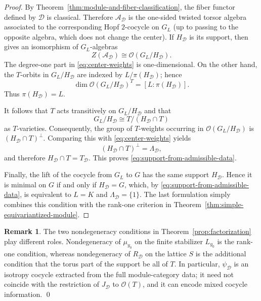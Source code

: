 \documentclass{amsart}
\theoremstyle{definition}
\newtheorem{remark}[theorem]{Remark}
\numberwithin{equation}{section}
\begin{document}
\begin{proof}
By Theorem~\ref{thm:module-and-fiber-classification}, the fiber functor defined by
$\mathcal D$ is classical.  Therefore $\mathcal A_{\mathcal D}$ is the one-sided
twisted torsor algebra associated to the corresponding Hopf $2$-cocycle on
$G_L$ (up to passing to the opposite algebra, which does not change the center).
If $H_{\mathcal D}$ is its support, then
\cite[Theorem~3.5]{G1} gives an isomorphism of $G_L$-algebras
\begin{equation}\label{eq:center-support-homogeneous-space}
 Z(\mathcal A_{\mathcal D})\cong\mathscr O(G_L/H_{\mathcal D}).
\end{equation}
The degree-one part in \eqref{eq:center-weights} is one-dimensional.  On the other
hand, the $T$-orbits in $G_L/H_{\mathcal D}$ are indexed by
$L/\pi(H_{\mathcal D})$; hence
\[
 \dim\mathscr O(G_L/H_{\mathcal D})^T
 =[L:\pi(H_{\mathcal D})].
\]
Thus $\pi(H_{\mathcal D})=L$.

It follows that $T$ acts transitively on $G_L/H_{\mathcal D}$ and that
\[
 G_L/H_{\mathcal D}
 \cong T/(H_{\mathcal D}\cap T)
\]
as $T$-varieties.  Consequently, the group of $T$-weights occurring in
$\mathscr O(G_L/H_{\mathcal D})$ is
$(H_{\mathcal D}\cap T)^\perp$.  Comparing this with
\eqref{eq:center-weights} yields
\[
 (H_{\mathcal D}\cap T)^\perp=\Lambda_{\mathcal D},
\]
and therefore $H_{\mathcal D}\cap T=T_{\mathcal D}$.  This proves
\eqref{eq:support-from-admissible-data}.

Finally, the lift of the cocycle from $G_L$ to $G$ has the same support
$H_{\mathcal D}$.  Hence it is minimal on $G$ if and only if
$H_{\mathcal D}=G$, which, by \eqref{eq:support-from-admissible-data}, is equivalent
to $L=K$ and $\Lambda_{\mathcal D}=\{1\}$.  The last formulation simply combines
this condition with the rank-one criterion in
Theorem~\ref{thm:simple-equivariantized-module}.
\end{proof}

\begin{remark}\label{rem:two-nondegeneracy-conditions}
The two nondegeneracy conditions in Theorem~\ref{prop:factorization} play
different roles.  Nondegeneracy of $\mu_{y_0}$ on the finite stabilizer
$L_{y_0}$ is the rank-one condition, whereas nondegeneracy of
$R_{\mathcal D}$ on the lattice $S$ is the additional condition that the torus
part of the support be all of $T$.  In particular,
$\psi_{\mathcal D}$ is an isotropy cocycle extracted from the full module-category
data; it need not coincide with the restriction of $J_{\mathcal D}$ to
$\mathscr O(T)$, and it can encode mixed cocycle information. \qed
\end{remark}
\end{document}
